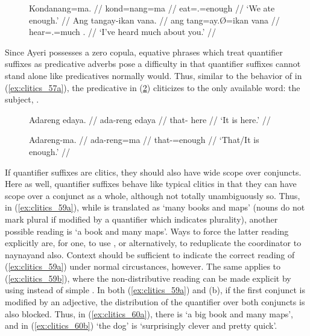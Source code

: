 \begin{figure}
\pex\label{ex:clitics_57}
\a\label{ex:clitics_57a}\begingl
	\gla Kondanang=ma. //
	\glb kond=nang=ma //
	\glc eat=\Fpl{}.\Aarg{}=enough //
	\glft `We ate enough.' //
\endgl
\a\label{ex:clitics_57b}\begingl
	\gla Ang tangay-ikan vana. //
	\glb ang tang=ay.Ø=ikan vana //
	\glc \AgtT{} hear=\Fsg{}.\Top{}=much \Second{}.\Gen{} //
	\glft `I've heard much about you.' //
\endgl
\xe
\end{figure}

Since Ayeri possesses a zero copula, equative phrases which treat quantifier
suffixes as predicative adverbs pose a difficulty in that quantifier suffixes
cannot stand alone like predicatives normally would. Thus, similar to the
behavior of  in (\ref{ex:clitics_57a}), the predicative
 in (\ref{ex:clitics_58b}) cliticizes to the only available word:
the subject, .

\begin{figure}
\pex\label{ex:clitics_58}
\a\label{ex:clitics_58a}\begingl
	\gla Adareng edaya. //
	\glb ada-reng edaya //
	\glc that-\AargI{} here //
	\glft `It is here.' //
\endgl

\a\label{ex:clitics_58b}\begingl
	\gla Adareng-ma. //
	\glb ada-reng=ma //
	\glc that-\AargI{}=enough //
	\glft `That/It is enough.' //
\endgl
\xe
\end{figure}

If quantifier suffixes are clitics, they should also have wide scope over
conjuncts. Here as well, quantifier suffixes behave like typical clitics
in that they can have scope over a conjunct as a whole, although not
totally unambiguously so. Thus, in (\ref{ex:clitics_59a}), while  is translated as `many books and
maps' (nouns do not mark plural if modified by a quantifier which indicates
plurality), another possible reading is `a book and many maps'. Ways to force
the latter reading explicitly are, for one, to use , or alternatively, to reduplicate the coordinator
 to  {naynay}{and also}. Context should be
sufficient to indicate the correct reading of (\ref{ex:clitics_59a}) under
normal circustances, however. The same applies to (\ref{ex:clitics_59b}), where
the non-distributive reading can be made explicit by using 
instead of simple . In both (\ref{ex:clitics_59a}) and (b), if
the first conjunct is modified by an adjective, the distribution of the
quantifier over both conjuncts is also blocked. Thus, in
(\ref{ex:clitics_60a}), there is `a big book and many maps', and in
(\ref{ex:clitics_60b}) `the dog' is `surprisingly clever and pretty quick'.

